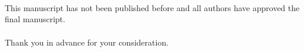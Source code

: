\documentclass[usetimesfont,usebwarms,a4paper,nofold]{damtplet}
\begin{document}
\begin{letter}{}{
		
		\\
		\\\\
		\\
		\\
		\\
		 }
{   \\ \\This manuscript has not been published before and all authors have approved the final manuscript.
   \\\\Thank you in advance for your consideration.
}

\end{letter}
\end{document}
